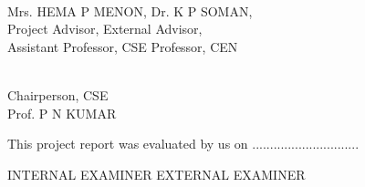 \begin{spacing}{2.0}
\end{spacing}
\hfill \\
Mrs. HEMA P MENON,  \hfill	                                    Dr. K P SOMAN, \\
Project Advisor,         \hfill                                             External Advisor,\\
Assistant Professor, CSE					   \hfill   Professor, CEN 
\begin{spacing}{2.0}
\end{spacing}
\hfill \\
Chairperson, CSE \\
Prof. P N KUMAR \\


\begin{center}
This project report was evaluated by us on ..............................
\end{center}
\begin{spacing}{2.0}
\end{spacing}
 INTERNAL EXAMINER \hfill EXTERNAL EXAMINER 